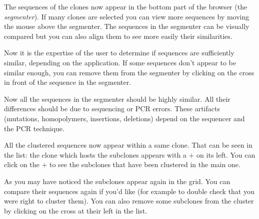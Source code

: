 \documentclass[10pt]{article}
\begin{document}

The sequences of the clones now appear in the bottom part of the browser (the
\textit{segmenter}). If many clones are selected you can view more sequences
by moving the mouse above the segmenter.
The sequences in the segmenter can be visually compared but you can also align
them to see more easily their similarities.

Now it is the expertise of the user to determine if sequences are sufficiently
similar, depending on the application. If some sequences don't appear to be similar enough, you can remove
them from the segmenter by clicking on the cross in front of the sequence in
the segmenter.

Now all the sequences in the segmenter should be highly similar. All their
differences should be due to sequencing or PCR errors.
These artifacts (mutations, homopolymers, insertions, deletions)
depend on the sequencer and the PCR technique.


All the clustered sequences now appear within a same clone. That can be seen
in the list: the clone which hosts the subclones appears with a $+$ on its
left. You can click on the $+$ to see the subclones that have been clustered in
the main one.

As you may have noticed the subclones appear again in the grid. You can
compare their sequences again if you'd like (for example to double check that
you were right to cluster them). You can also remove some subclones from the
cluster by clicking on the cross at their left in the list.

\end{document}
